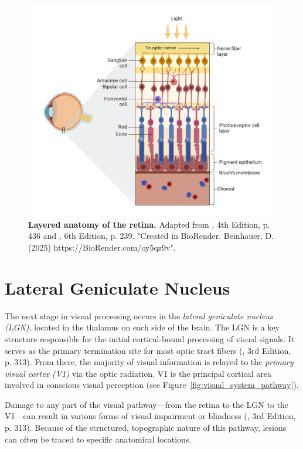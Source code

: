 \begin{figure}
    \centering
    \includegraphics[width=\linewidth]{img/retina_anatomy.pdf}
    \caption{\textbf{Layered anatomy of the retina.} Adapted from \citet{schwartz1991principles}, 4th Edition, p. 436 and \citet{purves2019neurosciences}, 6th Edition, p. 239. "Created in BioRender. Beinhauer, D. (2025) https://BioRender.com/oy5qz9v".}
    \label{fig:retina_anatomy}
\end{figure}


\section{Lateral Geniculate Nucleus}
\label{sec:lgn}

The next stage in visual processing occurs in the \emph{lateral geniculate nucleus (LGN)}, located in the thalamus on each side of the brain. The LGN is a key structure responsible for the initial cortical-bound processing of visual signals. It serves as the primary termination site for most optic tract fibers (\citet{bear2020neuroscience}, 3rd Edition, p. 313). From there, the majority of visual information is relayed to the \emph{primary visual cortex (V1)} via the optic radiation. V1 is the principal cortical area involved in conscious visual perception (see Figure~\ref{fig:visual_system_pathway}).

Damage to any part of the visual pathway—from the retina to the LGN to the V1—can result in various forms of visual impairment or blindness (\citet{bear2020neuroscience}, 3rd Edition, p. 313). Because of the structured, topographic nature of this pathway, lesions can often be traced to specific anatomical locations.

